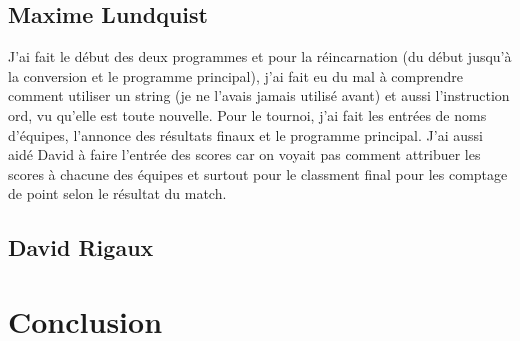\documentclass[12pt]{article}
\begin{document}
\subsection{Maxime Lundquist}

J'ai fait le début des deux programmes et pour la réincarnation (du début jusqu'à la conversion et le programme principal), j'ai fait eu du mal à comprendre comment utiliser un string (je ne l'avais jamais utilisé avant) et aussi l'instruction ord, vu qu'elle est toute nouvelle.
Pour le tournoi, j'ai fait les entrées de noms d'équipes, l'annonce des résultats finaux et le programme principal. J'ai aussi aidé David à faire l'entrée des scores car on voyait pas comment attribuer les scores à chacune des équipes et surtout pour le classment final pour les comptage de point selon le résultat du match. 
\subsection{David Rigaux}

\section{Conclusion}
\end{document}
